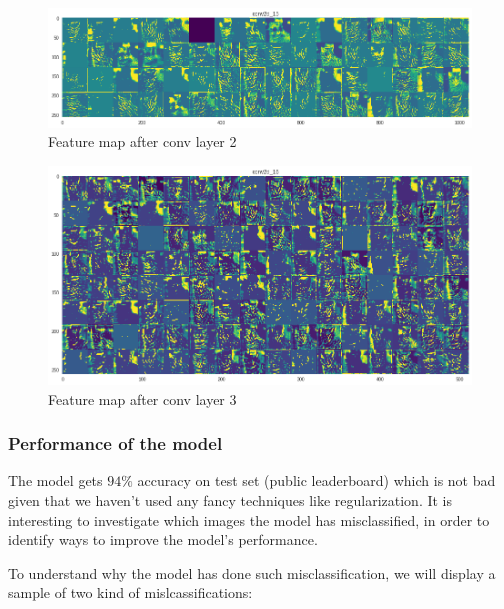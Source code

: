 \documentclass[a4paper]{article}
\begin{document}
\begin{figure}[h!]
	\centering
	\includegraphics[scale=.3]{fp2.png}
	\caption{Feature map after conv layer 2}
	\label{fig:fp2}
\end{figure}

\begin{figure}[h!]
	\centering
	\includegraphics[scale=.3]{fp3.png}
	\caption{Feature map after conv layer 3}
	\label{fig:fp3}
\end{figure}

\subsubsection{Performance of the model}
The model gets $94\%$ accuracy on test set (public leaderboard) which is not bad given that we haven't used any fancy techniques like regularization. It is interesting to investigate which images the model has misclassified, in order to identify ways to improve the model's performance. 

To understand why the model has done such misclassification, we will display a sample of two kind of mislcassifications:
\end{document}
